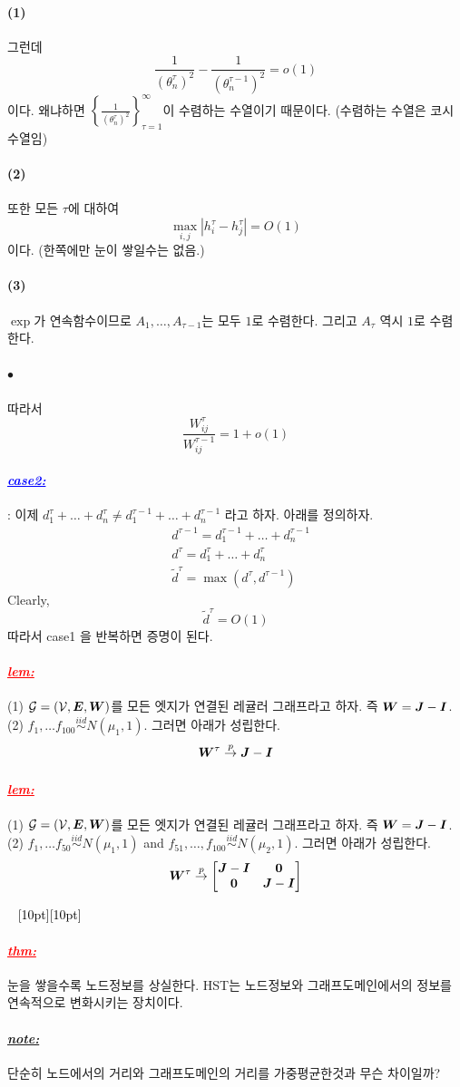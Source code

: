 \documentclass[12pt,oneside,english,a4paper]{article}
\newcommand{\dash}{\noindent \newline\textcolor{black}{\hrulefill~ \raisebox{-2.5pt}[10pt][10pt]{\leafright \decofourleft \decothreeleft  \aldineright \decotwo \floweroneleft \decoone   \floweroneright \decotwo \aldineleft\decothreeright \decofourright \leafleft} ~  \hrulefill}}
\def\ck{\paragraph{\Large$\bullet$}\Large}
\def\note{\paragraph{\Large\textit{\underline{note:}}}\Large}
\newcommand{\parablue}[1]{\paragraph{\Large\textcolor{blue}{\it\underline{\textbf{#1:}}}}\Large}
\newcommand{\parared}[1]{\paragraph{\Large\textcolor{red}{\it\underline{\textbf{#1:}}}}\Large}
\def\one{\paragraph{\Large(1)}\Large}
\def\two{\paragraph{\Large(2)}\Large}
\def\three{\paragraph{\Large(3)}\Large}
\newcommand{\bsE}{\mbox{\boldmath $E$}}
\newcommand{\bsI}{\mbox{\boldmath $I$}}
\newcommand{\bsJ}{\mbox{\boldmath $J$}}
\newcommand{\bsW}{\mbox{\boldmath $W$}}
\begin{document}
\one 그런데 
\[
\frac{1}{(\theta_n^\tau)^2}-\frac{1}{(\theta_n^{\tau-1})^2}=o(1)
\]
이다. 왜냐하면 $\left\{\frac{1}{(\theta_n^{\tau})^2}\right\}_{\tau=1}^{\infty}$이 수렴하는 수열이기 때문이다. (수렴하는 수열은 코시수열임) 
\two 또한 모든 $\tau$에 대하여 
\[
\max_{i,j}|h_i^{\tau}-h_j^{\tau}|=O(1)
\]
이다. (한쪽에만 눈이 쌓일수는 없음.) 
\three $\exp$가 연속함수이므로 $A_1,\dots,A_{\tau-1}$는 모두 $1$로 수렴한다. 그리고 $A_{\tau}$ 역시 $1$로 수렴한다.

\ck 따라서 
\[
\frac{W_{ij}^{\tau}}{W_{ij}^{\tau-1}}
=1+o(1)
\]

\parablue{case2} :  이제 $d_1^{\tau}+\dots+d_n^{\tau}\neq d_1^{\tau-1}+\dots+d_n^{\tau-1}$ 라고 하자. 아래를 정의하자. 
\begin{align*}
&d^{\tau-1}=d_1^{\tau-1}+\dots+d_n^{\tau-1} \\
&d^{\tau}=d_1^{\tau}+\dots+d_n^{\tau} \\
& \tilde{d}^{\tau}=\max(d^{\tau},d^{\tau-1})
\end{align*}
Clearly,
\[
\tilde{d}^{\tau}=O(1)
\]
따라서 case1 을 반복하면 증명이 된다. 

\parared{lem} (1) $\cal G=(V,\bsE,\bsW)$를 모든 엣지가 연결된 레귤러 그래프라고 하자. 즉 $\bsW=\bsJ-\bsI$. (2) $f_1,\dots f_{100} \overset{iid}{\sim} N(\mu_1,1)$. 그러면 아래가 성립한다. 
\[
\bsW^{\tau} \overset{p}{\to} \bsJ-\bsI
\]

\parared{lem} (1) $\cal G=(V,\bsE,\bsW)$를 모든 엣지가 연결된 레귤러 그래프라고 하자. 즉 $\bsW=\bsJ-\bsI$. (2) $f_1,\dots f_{50} \overset{iid}{\sim} N(\mu_1,1)$ and $f_{51},\dots,f_{100} \overset{iid}{\sim} N(\mu_2,1)$. 그러면 아래가 성립한다. 
\[
\bsW^{\tau} \overset{p}{\to} \begin{bmatrix}\bsJ-\bsI & \bf{0} \\ \bf{0} & \bsJ-\bsI \end{bmatrix}
\]

\dash 
\parared{thm} 눈을 쌓을수록 노드정보를 상실한다. HST는 노드정보와 그래프도메인에서의 정보를 연속적으로 변화시키는 장치이다. 
\note 단순히 노드에서의 거리와 그래프도메인의 거리를 가중평균한것과 무슨 차이일까? 
\end{document}

